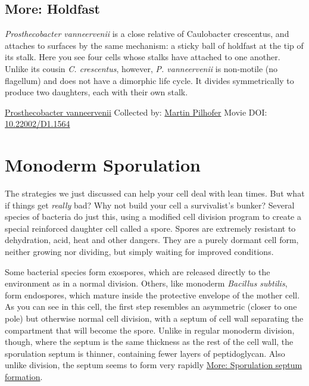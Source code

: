 \documentclass[]{tufte-book}
\begin{document}
\hypertarget{Holdfast}{%
\subsection*{More: Holdfast}\label{Holdfast}}

\emph{Prosthecobacter vanneervenii} is a close relative of Caulobacter crescentus, and attaches to surfaces by the same mechanism: a sticky ball of holdfast at the tip of its stalk. Here you see four cells whose stalks have attached to one another. Unlike its cousin \emph{C. crescentus}, however, \emph{P. vanneervenii} is non-motile (no flagellum) and does not have a dimorphic life cycle. It divides symmetrically to produce two daughters, each with their own stalk.



\hypertarget{htmlwidget-59f9a9d8b8768edd5397}{}

\label{fig:8-4a}\protect\hyperlink{tree}{Prosthecobacter vanneervenii} Collected by: \protect\hyperlink{martin_pilhofer}{Martin Pilhofer} Movie DOI: \href{https://doi.org/10.22002/D1.1564}{10.22002/D1.1564}

\hypertarget{monoderm-sporulation}{%
\section{Monoderm Sporulation}\label{monoderm-sporulation}}

The strategies we just discussed can help your cell deal with lean times. But what if things get \emph{really} bad? Why not build your cell a survivalist's bunker? Several species of bacteria do just this, using a modified cell division program to create a special reinforced daughter cell called a spore. Spores are extremely resistant to dehydration, acid, heat and other dangers. They are a purely dormant cell form, neither growing nor dividing, but simply waiting for improved conditions.

Some bacterial species form exospores, which are released directly to the environment as in a normal division. Others, like monoderm \emph{Bacillus subtilis}, form endospores, which mature inside the protective envelope of the mother cell. As you can see in this cell, the first step resembles an asymmetric (closer to one pole) but otherwise normal cell division, with a septum of cell wall separating the compartment that will become the spore. Unlike in regular monoderm division, though, where the septum is the same thickness as the rest of the cell wall, the sporulation septum is thinner, containing fewer layers of peptidoglycan. Also unlike division, the septum seems to form very rapidly \protect\hyperlink{Sporulation_septum_formation}{More: Sporulation septum formation}.
\end{document}
